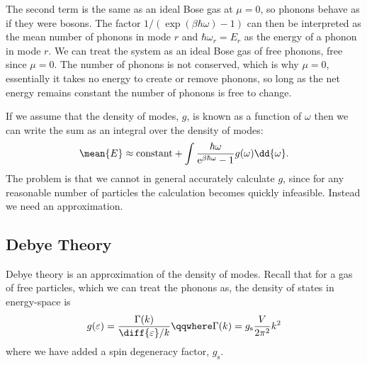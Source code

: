 \documentclass[fleqn]{NotesClass}
\newcommand*{\e}{\mathrm{e}}
\begin{document}
    The second term is the same as an ideal Bose gas at \(\mu = 0\), so phonons behave as if they were bosons.
    The factor \(1/(\exp(\beta\hbar\omega) - 1)\) can then be interpreted as the mean number of phonons in mode \(r\) and \(\hbar\omega_r = E_r\) as the energy of a phonon in mode \(r\).
    We can treat the system as an ideal Bose gas of free phonons, free since \(\mu = 0\).
    The number of phonons is not conserved, which is why \(\mu = 0\), essentially it takes no energy to create or remove phonons, so long as the net energy remains constant the number of phonons is free to change.
    
    If we assume that the density of modes, \(g\), is known as a function of \(\omega\) then we can write the sum as an integral over the density of modes:
    \begin{equation}
        \mean{E} \approx \text{constant} + \int \frac{\hbar\omega}{\e^{\beta\hbar\omega} - 1} g(\omega) \dd{\omega}.
    \end{equation}
    The problem is that we cannot in general accurately calculate \(g\), since for any reasonable number of particles the calculation becomes quickly infeasible.
    Instead we need an approximation.
    
    \subsection{Debye Theory}
    Debye theory is an approximation of the density of modes.
    Recall that for a gas of free particles, which we can treat the phonons as, the density of states in energy-space is
    \begin{equation}
        g(\varepsilon) = \frac{\Gamma(k)}{\diff{\varepsilon}/{k}} \qqwhere \Gamma(k) = g_{\mathrm{s}} \frac{V}{2\pi^2}k^2
    \end{equation}
    where we have added a spin degeneracy factor, \(g_{\mathrm{s}}\).
    
\end{document}
